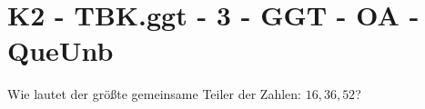 \section{K2 - TBK.ggt - 3 - GGT - OA - QueUnb}

\begin{beispiel}{1} %
				Wie lautet der größte gemeinsame Teiler der Zahlen: $16,36,52$?\leer
				
\end{beispiel}